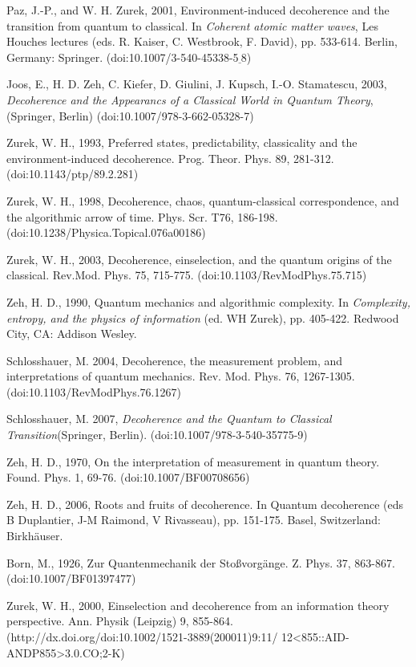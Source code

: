 \documentclass[aps,amsmath,amssymb,amsfonts,floatfix]{revtex4-1}
\newcommand{\+}         {\dagger}
\begin{document}
{{{\begin{references}
 Paz, J.-P., and W. H. Zurek, 2001, Environment-induced decoherence and the transition from quantum to classical. In {\it Coherent atomic matter waves}, Les Houches lectures (eds. R. Kaiser, C. Westbrook, F. David), pp. 533-614. Berlin, Germany: Springer. (doi:10.1007/3-540-45338-5$\underline \ $8)

 Joos, E., H. D. Zeh, C. Kiefer, D. Giulini, J. Kupsch,
I.-O. Stamatescu, 2003, {\it Decoherence and the Appearancs of
a Classical World in Quantum Theory}, (Springer, Berlin) (doi:10.1007/978-3-662-05328-7)

 Zurek, W. H., 1993, Preferred states, predictability, classicality and the environment-induced
decoherence. Prog. Theor. Phys. 89, 281-312. (doi:10.1143/ptp/89.2.281)

 Zurek, W. H.,  1998, Decoherence, chaos, quantum-classical correspondence, and the algorithmic arrow of time. Phys. Scr. T76, 186-198. (doi:10.1238/Physica.Topical.076a00186)

 Zurek, W. H., 2003, Decoherence, einselection, and the quantum origins of the classical. Rev.Mod.
Phys. 75, 715-775. (doi:10.1103/RevModPhys.75.715)

 Zeh, H. D., 1990, Quantum mechanics and algorithmic complexity. In {\it Complexity, entropy,
and the physics of information} (ed. WH Zurek), pp. 405-422. Redwood City, CA: Addison
Wesley.

 Schlosshauer, M. 2004, Decoherence, the measurement problem, and interpretations of
quantum mechanics. Rev. Mod. Phys. 76, 1267-1305. (doi:10.1103/RevModPhys.76.1267)

 Schlosshauer, M. 2007, {\it Decoherence and the Quantum to Classical Transition}(Springer, Berlin). (doi:10.1007/978-3-540-35775-9)

 Zeh, H. D., 1970, On the interpretation of measurement in quantum theory. Found. Phys. 1, 69-76.
(doi:10.1007/BF00708656)

 Zeh, H. D., 2006, Roots and fruits of decoherence. In Quantum decoherence (eds B Duplantier, J-M
Raimond, V Rivasseau), pp. 151-175. Basel, Switzerland: Birkhäuser.

 Born, M., 1926, Zur Quantenmechanik der Stoßvorgänge. Z. Phys. 37, 863-867.
(doi:10.1007/BF01397477)

 Zurek, W. H., 2000, Einselection and decoherence from an information theory perspective.
Ann. Physik (Leipzig) 9, 855-864. (http://dx.doi.org/doi:10.1002/1521-3889(200011)9:11/
12<855::AID-ANDP855>3.0.CO;2-K)


\end{references}}}}
\end{document}

